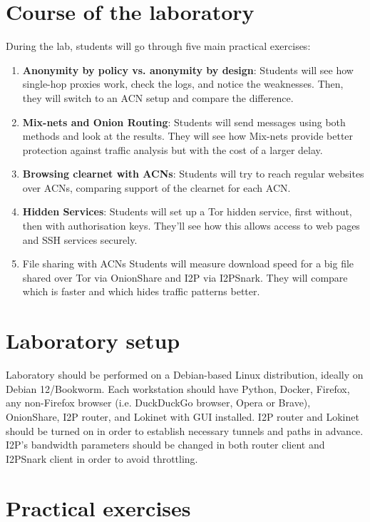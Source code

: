 \section{Course of the laboratory}
During the lab, students will go through five main practical exercises:
\begin{enumerate}
    \item \textbf{Anonymity by policy vs. anonymity by design}: Students will see how single-hop proxies work, check the logs, and notice the weaknesses. Then, they will switch to an ACN setup and compare the difference.
\item \textbf{Mix-nets and Onion Routing}: Students will send messages using both methods and look at the results. They will see how Mix-nets provide better protection against traffic analysis but with the cost of a larger delay.
\item \textbf{Browsing clearnet with ACNs}: Students will try to reach regular websites over ACNs, comparing support of the clearnet for each ACN.
\item \textbf{Hidden Services}: Students will set up a Tor hidden service, first without, then with authorisation keys. They’ll see how this allows access to web pages and SSH services securely.
\item File sharing with ACNs
Students will measure download speed for a big file shared over Tor via OnionShare and I2P via I2PSnark. They will compare which is faster and which hides traffic patterns better.
\end{enumerate}

\section{Laboratory setup}
Laboratory should be performed on a Debian-based Linux distribution, ideally on Debian 12/Bookworm. Each workstation should have Python, Docker, Firefox, any non-Firefox browser (i.e. DuckDuckGo browser, Opera or Brave), OnionShare, I2P router, and Lokinet with GUI installed. I2P router and Lokinet should be turned on in order to establish necessary tunnels and paths in advance. I2P's bandwidth parameters should be changed in both router client and I2PSnark client in order to avoid throttling.

\section{Practical exercises}

